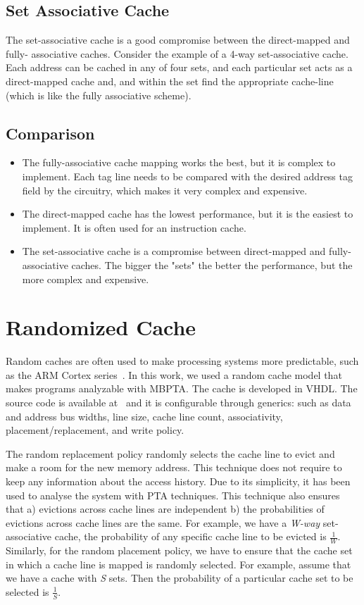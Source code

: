 \subsection{Set Associative Cache}
The set-associative cache is a good compromise between the direct-mapped and fully- associative caches. Consider the example of a 4-way set-associative cache. Each address can be cached in any of four sets, and each particular set acts as a direct-mapped cache and, and within the set find the appropriate cache-line (which is like the fully associative scheme). 

\subsection{Comparison}
\begin{itemize}


\item {The fully-associative cache mapping works the best, but it is complex to implement. Each tag line needs to be compared with the desired  address tag field by the circuitry, which makes it very complex and expensive.}



\item{The direct-mapped cache has the lowest performance, but it is the easiest to implement. It is often used for an instruction cache.}

\item{The set-associative cache is a compromise between direct-mapped and fully-associative caches. The bigger the "sets" the  better the performance, but the more  complex and expensive.}

\end{itemize}

\section{Randomized Cache}
Random caches are often used to make processing systems more predictable,
such as the ARM Cortex series~\cite{ARM}.
In this work, we used a random cache model that makes programs analyzable
with MBPTA. The cache is developed in VHDL. The source code is available at~\cite{MISTLAB} and it is
configurable through generics: such as data and address bus
widths, line size, cache line count, associativity, placement/replacement, and write policy. 


The random replacement policy randomly selects the cache line to evict and make a room for the new memory address. This technique does not require to keep any information about the access history. Due to its simplicity, it has been used to analyse the system with PTA techniques. This technique also ensures that a) evictions across cache lines are independent b) the probabilities of evictions across cache lines are the same. For example, we have a \textit{W-way} set-associative cache, the probability of any specific cache line to be evicted is $\frac{1}{W}$.  Similarly, for the random placement policy, we have to ensure that the cache set in which a cache line is mapped is randomly selected. For example, assume that we have a cache with \textit{S} sets. Then the probability of a particular cache set to be selected is $\frac{1}{S}$.


